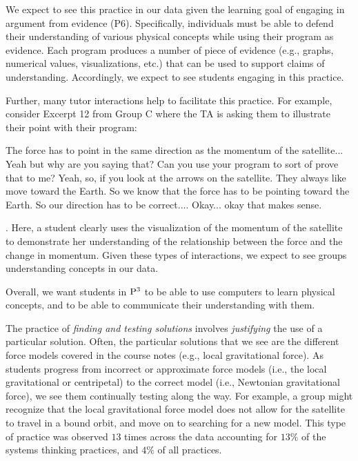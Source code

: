\documentclass{msuphddissertation}
\begin{document}
\begin{doublespace}
We expect to see this practice in our data given the learning goal of engaging in argument from evidence (P6).  Specifically, individuals must be able to defend their understanding of various physical concepts while using their program as evidence.  Each program produces a number of piece of evidence (e.g., graphs, numerical values, visualizations, etc.) that can be used to support claims of understanding.  Accordingly, we expect to see students engaging in this practice.

Further, many tutor interactions help to facilitate this practice.  For example, consider Excerpt 12 from Group C where the TA is asking them to illustrate their point with their program: \begin{description}
\SA The force has to point in the same direction as the momentum of the satellite...
\TA Yeah but why are you saying that?
\TA Can you use your program to sort of prove that to me?
\SA Yeah, so, if you look at the arrows on the satellite.
\SA They always like move toward the Earth.
\SA So we know that the force has to be pointing toward the Earth.
\SA So our direction has to be correct....
\TA Okay... okay that makes sense.
\end{description}.  Here, a student clearly uses the visualization of the momentum of the satellite to demonstrate her understanding of the relationship between the force and the change in momentum.  Given these types of interactions, we expect to see groups understanding concepts in our data.

Overall, we want students in ${\rm P}^{3}$ to be able to use computers to learn physical concepts, and to be able to communicate their understanding with them.

The practice of \textit{finding and testing solutions} involves \textit{justifying} the use of a particular solution.  Often, the particular solutions that we see are the different force models covered in the course notes (e.g., local gravitational force).  As students progress from incorrect or approximate force models (i.e., the local gravitational or centripetal) to the correct model (i.e., Newtonian gravitational force), we see them continually testing along the way.  For example, a group might recognize that the local gravitational force model does not allow for the satellite to travel in a bound orbit, and move on to searching for a new model.  This type of practice was observed $13$ times across the data  accounting for $13\%$ of the systems thinking practices, and $4\%$ of all practices.


\end{doublespace}
\end{document}

